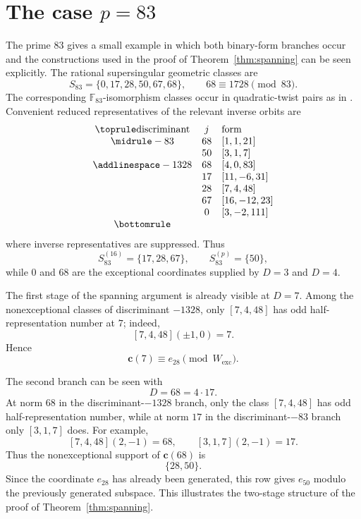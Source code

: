 \documentclass[11pt]{amsart}
\theoremstyle{definition}
\theoremstyle{remark}
\newcommand{\F}{\mathbb{F}}
\newcommand{\crow}{\mathbf{c}}
\begin{document}
\section{The case \texorpdfstring{$p=83$}{p=83}}\label{sec:example83}

The prime $83$ gives a small example in which both binary-form branches
occur and the constructions used in the proof of
Theorem~\ref{thm:spanning} can be seen explicitly. The rational
supersingular geometric classes are
\[
  S_{83}=\{0,17,28,50,67,68\},
  \qquad
  68\equiv1728\pmod{83}.
\]
The corresponding $\F_{83}$-isomorphism classes occur in quadratic-twist
pairs as in \cite[Example~3.8]{XZDQ2025}. Convenient reduced
representatives of the relevant inverse orbits are
\[
\begin{array}{ccl}
\toprule
\text{discriminant} & j & \text{form}\\
\midrule
-83   & 68 & [1,1,21]\\
      & 50 & [3,1,7]\\
\addlinespace
-1328 & 68 & [4,0,83]\\
      & 17 & [11,-6,31]\\
      & 28 & [7,4,48]\\
      & 67 & [16,-12,23]\\
      & 0  & [3,-2,111]\\
\bottomrule
\end{array}
\]
where inverse representatives are suppressed. Thus
\[
  S_{83}^{(16)}=\{17,28,67\},
  \qquad
  S_{83}^{(p)}=\{50\},
\]
while $0$ and $68$ are the exceptional coordinates supplied by $D=3$
and $D=4$.

The first stage of the spanning argument is already visible at $D=7$.
Among the nonexceptional classes of discriminant $-1328$, only
$[7,4,48]$ has odd half-representation number at $7$; indeed,
\[
  [7,4,48](\pm1,0)=7.
\]
Hence
\[
  \crow(7)\equiv e_{28}\pmod{W_{\mathrm{exc}}}.
\]

The second branch can be seen with
\[
  D=68=4\cdot17.
\]
At norm $68$ in the discriminant-$-1328$ branch, only the class
$[7,4,48]$ has odd half-representation number, while at norm $17$ in the
discriminant-$-83$ branch only $[3,1,7]$ does. For example,
\[
  [7,4,48](2,-1)=68,
  \qquad
  [3,1,7](2,-1)=17.
\]
Thus the nonexceptional support of $\crow(68)$ is
\[
  \{28,50\}.
\]
Since the coordinate $e_{28}$ has already been generated, this row gives
$e_{50}$ modulo the previously generated subspace. This illustrates the
two-stage structure of the proof of Theorem~\ref{thm:spanning}.
\end{document}

